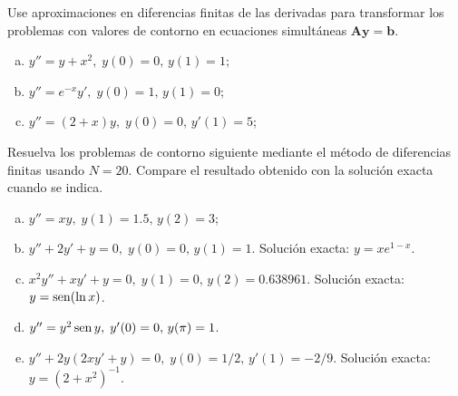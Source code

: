 \documentclass[11pt]{article}
\begin{document}
\begin{question} %
Use aproximaciones en diferencias finitas de las derivadas para transformar los problemas con valores de contorno en ecuaciones simultáneas $\bm{A} \bm{y} = \bm{b}$.
\begin{enumerate}[a)]
    \item $y'' = y + x^2,\; y(0) = 0, \, y(1) = 1$;
    \item $y'' = e^{-x} y',\; y(0) = 1, \, y(1) = 0$;
    \item $y'' = (2 + x) y,\; y(0) = 0, \, y'(1) = 5$;
\end{enumerate}
\end{question}

\begin{question} %
Resuelva los problemas de contorno siguiente mediante el método de diferencias finitas usando $N = 20$. Compare el resultado obtenido con la solución exacta cuando se indica.
\begin{enumerate}[a)]
    \item $y'' = xy,\; y(1) = 1.5, \, y(2) = 3$;
    \item $y'' + 2 y' + y = 0,\; y(0) = 0, \, y(1) = 1$. Solución exacta: $y = x e^{1 - x}$.
    \item $x^2 y'' + x y' + y = 0,\; y(1) = 0, \, y(2) = 0.638961$. Solución exacta: $y = \operatorname{sen}(\ln x)$.
    \item $y'' = y^2 \operatorname{sen} y,\; y'(0) = 0, \, y(\pi) = 1$. 
    \item $y'' + 2 y (2 x y' + y)= 0,\; y(0) = 1/2, \, y'(1) = -2/9$. Solución exacta: $y = (2 + x^2)^{-1}$.
\end{enumerate}
\end{question}
\end{document}
